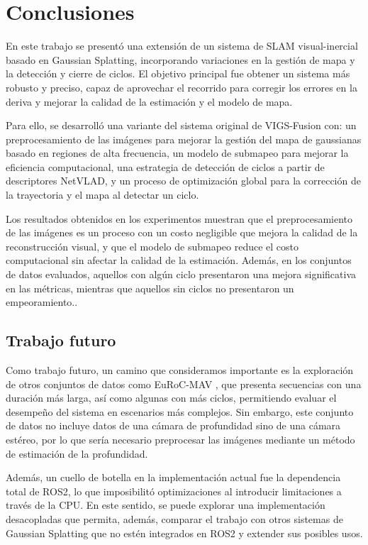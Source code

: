 \chapter{Conclusiones}
\label{conclusiones}

En este trabajo se presentó una extensión de un sistema de SLAM visual-inercial basado en Gaussian Splatting, incorporando variaciones en la gestión de mapa y la detección y cierre de ciclos. El objetivo principal fue obtener un sistema más robusto y preciso, capaz de aprovechar el recorrido para corregir los errores en la deriva y mejorar la calidad de la estimación y el modelo de mapa.

Para ello, se desarrolló una variante del sistema original de VIGS-Fusion con: un preprocesamiento de las imágenes para mejorar la gestión del mapa de gaussianas basado en regiones de alta frecuencia, un modelo de submapeo para mejorar la eficiencia computacional, una estrategia de detección de ciclos a partir de descriptores NetVLAD, y un proceso de optimización global para la corrección de la trayectoria y el mapa al detectar un ciclo.

Los resultados obtenidos en los experimentos muestran que el preprocesamiento de las imágenes es un proceso con un costo negligible que mejora la calidad de la reconstrucción visual, y que el modelo de submapeo reduce el costo computacional sin afectar la calidad de la estimación. Además, en los conjuntos de datos evaluados, aquellos con algún ciclo presentaron una mejora significativa en las métricas, mientras que aquellos sin ciclos no presentaron un empeoramiento..

\section{Trabajo futuro}

Como trabajo futuro, un camino que consideramos importante es la exploración de otros conjuntos de datos como EuRoC-MAV \cite{eurocmav}, que presenta secuencias con una duración más larga, así como algunas con más ciclos, permitiendo evaluar el desempeño del sistema en escenarios más complejos. Sin embargo, este conjunto de datos no incluye datos de una cámara de profundidad sino de una cámara estéreo, por lo que sería necesario preprocesar las imágenes mediante un método de estimación de la profundidad.

Además, un cuello de botella en la implementación actual fue la dependencia total de ROS2, lo que imposibilitó optimizaciones al introducir limitaciones a través de la CPU. En este sentido, se puede explorar una implementación desacopladas que permita, además, comparar el trabajo con otros sistemas de Gaussian Splatting que no estén integrados en ROS2 y extender sus posibles usos. 